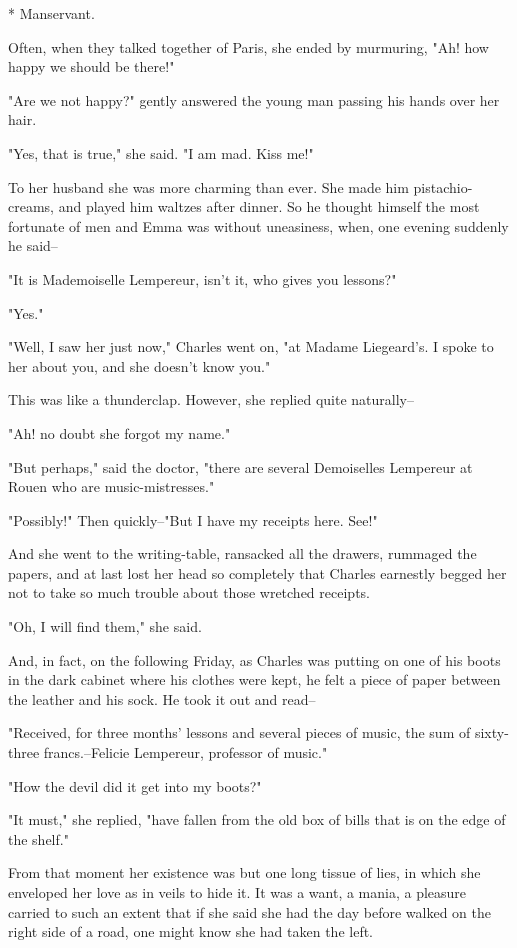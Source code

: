 \documentclass{tufte-book}
\begin{document}
     * Manservant.


Often, when they talked together of Paris, she ended by murmuring, "Ah!
how happy we should be there!"

"Are we not happy?" gently answered the young man passing his hands over
her hair.

"Yes, that is true," she said. "I am mad. Kiss me!"

To her husband she was more charming than ever. She made him
pistachio-creams, and played him waltzes after dinner. So he thought
himself the most fortunate of men and Emma was without uneasiness, when,
one evening suddenly he said--

"It is Mademoiselle Lempereur, isn't it, who gives you lessons?"

"Yes."

"Well, I saw her just now," Charles went on, "at Madame Liegeard's. I
spoke to her about you, and she doesn't know you."

This was like a thunderclap. However, she replied quite naturally--

"Ah! no doubt she forgot my name."

"But perhaps," said the doctor, "there are several Demoiselles Lempereur
at Rouen who are music-mistresses."

"Possibly!" Then quickly--"But I have my receipts here. See!"

And she went to the writing-table, ransacked all the drawers, rummaged
the papers, and at last lost her head so completely that Charles
earnestly begged her not to take so much trouble about those wretched
receipts.

"Oh, I will find them," she said.

And, in fact, on the following Friday, as Charles was putting on one
of his boots in the dark cabinet where his clothes were kept, he felt
a piece of paper between the leather and his sock. He took it out and
read--

"Received, for three months' lessons and several pieces of music, the
sum of sixty-three francs.--Felicie Lempereur, professor of music."

"How the devil did it get into my boots?"

"It must," she replied, "have fallen from the old box of bills that is
on the edge of the shelf."

From that moment her existence was but one long tissue of lies, in which
she enveloped her love as in veils to hide it. It was a want, a mania,
a pleasure carried to such an extent that if she said she had the day
before walked on the right side of a road, one might know she had taken
the left.
\end{document}
